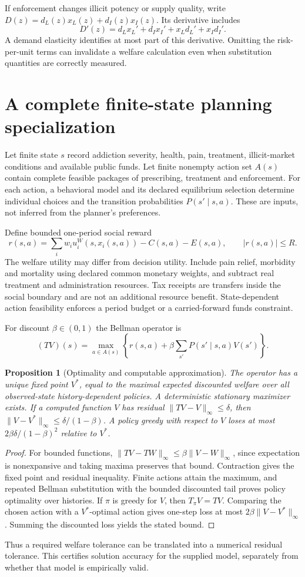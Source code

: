 \documentclass[11pt]{article}
\newtheorem{proposition}{Proposition}
\begin{document}
If enforcement changes illicit potency or supply quality, write $D(z)=d_L(z)x_L(z)+d_I(z)x_I(z)$. Its derivative includes
\[
 D'(z)=d_Lx_L'+d_Ix_I'+x_Ld_L'+x_Id_I'.
\]
A demand elasticity identifies at most part of this derivative. Omitting the risk-per-unit terms can invalidate a welfare calculation even when substitution quantities are correctly measured.

\section*{A complete finite-state planning specialization}
Let finite state $s$ record addiction severity, health, pain, treatment, illicit-market conditions and available public funds. Let finite nonempty action set $A(s)$ contain complete feasible packages of prescribing, treatment and enforcement. For each action, a behavioral model and its declared equilibrium selection determine individual choices and the transition probabilities $P(s'\mid s,a)$. These are inputs, not inferred from the planner's preferences.

Define bounded one-period social reward
\[
 r(s,a)=\sum_iw_i u_i^W(s,x_i(s,a))-C(s,a)-E(s,a),
 \qquad |r(s,a)|\leq R.
\]
The welfare utility may differ from decision utility. Include pain relief, morbidity and mortality using declared common monetary weights, and subtract real treatment and administration resources. Tax receipts are transfers inside the social boundary and are not an additional resource benefit. State-dependent action feasibility enforces a period budget or a carried-forward funds constraint.

For discount $\beta\in(0,1)$ the Bellman operator is
\[
 (TV)(s)=\max_{a\in A(s)}\left\{r(s,a)+\beta\sum_{s'}P(s'\mid s,a)V(s')\right\}.
\]
\begin{proposition}[Optimality and computable approximation]
The operator has a unique fixed point $V^*$, equal to the maximal expected discounted welfare over all observed-state history-dependent policies. A deterministic stationary maximizer exists. If a computed function $V$ has residual $\|TV-V\|_\infty\leq\delta$, then $\|V-V^*\|_\infty\leq\delta/(1-\beta)$. A policy greedy with respect to $V$ loses at most $2\beta\delta/(1-\beta)^2$ relative to $V^*$.
\end{proposition}
\begin{proof}
For bounded functions, $\|TV-TW\|_\infty\leq\beta\|V-W\|_\infty$, since expectation is nonexpansive and taking maxima preserves that bound. Contraction gives the fixed point and residual inequality. Finite actions attain the maximum, and repeated Bellman substitution with the bounded discounted tail proves policy optimality over histories. If $\pi$ is greedy for $V$, then $T_\pi V=TV$. Comparing the chosen action with a $V^*$-optimal action gives one-step loss at most $2\beta\|V-V^*\|_\infty$. Summing the discounted loss yields the stated bound.
\end{proof}
Thus a required welfare tolerance can be translated into a numerical residual tolerance. This certifies solution accuracy for the supplied model, separately from whether that model is empirically valid.
\end{document}
